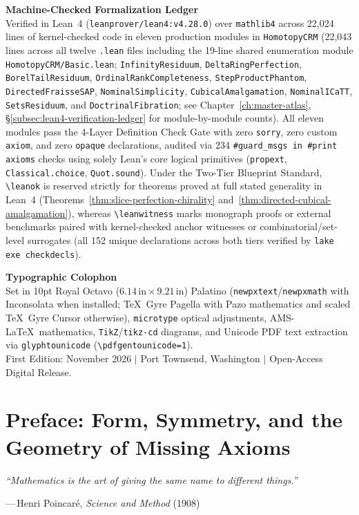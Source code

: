 \documentclass[10pt,twoside,openright]{book}
\newcommand{\chapterepigraph}[2]{%
  \vspace{-0.4em}\begin{flushright}\begin{minipage}{0.84\textwidth}%
    \raggedleft\small\itshape #1\par\vspace{0.3em}%
    \normalfont\footnotesize\upshape\color{CRMBlue}---\,#2%
  \end{minipage}\end{flushright}\vspace{1.05em}%
}
\theoremstyle{crmplain}
\theoremstyle{crmdef}
\theoremstyle{crmremark}
\begin{document}
\vspace{0.12em}
\noindent\textbf{Machine-Checked Formalization Ledger}\\
Verified in Lean~4 (\texttt{leanprover/lean4:v4.28.0}) over \texttt{mathlib4} across 22,024 lines of kernel-checked code in eleven production modules in \texttt{HomotopyCRM} (22,043 lines across all twelve \texttt{.lean} files including the 19-line shared enumeration module \texttt{HomotopyCRM/Basic.lean}; \texttt{InfinityResiduum}, \texttt{DeltaRingPerfection}, \texttt{BorelTailResiduum}, \texttt{OrdinalRankCompleteness}, \texttt{StepProductPhantom}, \texttt{DirectedFraisseSAP}, \texttt{NominalSimplicity}, \texttt{CubicalAmalgamation}, \texttt{NominalICaTT}, \texttt{SetsResiduum}, and \texttt{DoctrinalFibration}; see Chapter~\ref{ch:master-atlas}, \S\ref{subsec:lean4-verification-ledger} for module-by-module counts). All eleven modules pass the 4-Layer Definition Check Gate with zero \texttt{sorry}, zero custom \texttt{axiom}, and zero \texttt{opaque} declarations, audited via 234 \texttt{\#guard\_msgs in \#print axioms} checks using solely Lean's core logical primitives (\texttt{propext}, \texttt{Classical.choice}, \texttt{Quot.sound}). Under the Two-Tier Blueprint Standard, \texttt{\textbackslash leanok} is reserved strictly for theorems proved at full stated generality in Lean~4 (Theorems~\ref{thm:slice-perfection-chirality} and~\ref{thm:directed-cubical-amalgamation}), whereas \texttt{\textbackslash leanwitness} marks monograph proofs or external benchmarks paired with kernel-checked anchor witnesses or combinatorial/set-level surrogates (all 152 unique declarations across both tiers verified by \texttt{lake exe checkdecls}).

\vspace{0.12em}
\noindent\textbf{Typographic Colophon}\\
Set in 10pt Royal Octavo ($6.14\,\mathrm{in} \times 9.21\,\mathrm{in}$) Palatino (\texttt{newpxtext}/\texttt{newpxmath} with Inconsolata when installed; \TeX~Gyre Pagella with Pazo mathematics and scaled \TeX~Gyre Cursor otherwise), \texttt{microtype} optical adjustments, AMS-\LaTeX\ mathematics, \texttt{TikZ}/\texttt{tikz-cd} diagrams, and Unicode PDF text extraction via \texttt{glyphtounicode} (\texttt{\textbackslash pdfgentounicode=1}).\\
First Edition: November 2026 $|$ Port Townsend, Washington $|$ Open-Access Digital Release.\par
\endgroup
\cleardoublepage
\tableofcontents
\chapter{Preface: Form, Symmetry, and the Geometry of Missing Axioms}
\chapterepigraph{``Mathematics is the art of giving the same name to different things.''}{Henri Poincar\'e, \emph{Science and Method} (1908)}
\end{document}
